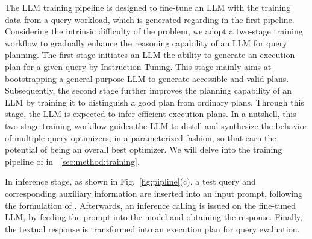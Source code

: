The LLM training pipeline is designed to fine-tune an LLM with the training data from a query workload, which is generated regarding \QueryInstruct in the first pipeline. Considering the intrinsic difficulty of the problem, we adopt a two-stage training workflow to gradually enhance the reasoning capability of an LLM for query planning.
The first stage initiates an LLM the ability to generate an execution plan for a given query by Instruction Tuning. This stage mainly aims at bootstrapping a general-purpose LLM to generate accessible and valid plans. 
Subsequently, the second stage further improves the planning capability of an LLM by training it to 
distinguish a good plan from ordinary plans.
Through this stage, the LLM is expected to infer efficient execution plans. 
In a nutshell,  this two-stage training workflow guides the LLM to distill and synthesize the behavior of multiple query optimizers, in a parameterized fashion, so that earn the potential of being an overall best optimizer. We will delve into the training pipeline of \LLMQO in ~\cref{sec:method:training}.

In inference stage, as shown in Fig.~\ref{fig:pipline}(c), a test query and corresponding auxiliary information are inserted into an input prompt, following the formulation of \QueryInstruct. Afterwards, an  inference calling is issued on the fine-tuned LLM, by feeding the  prompt into the model and obtaining the response. Finally, the textual response is transformed into an execution plan for query  evaluation.


